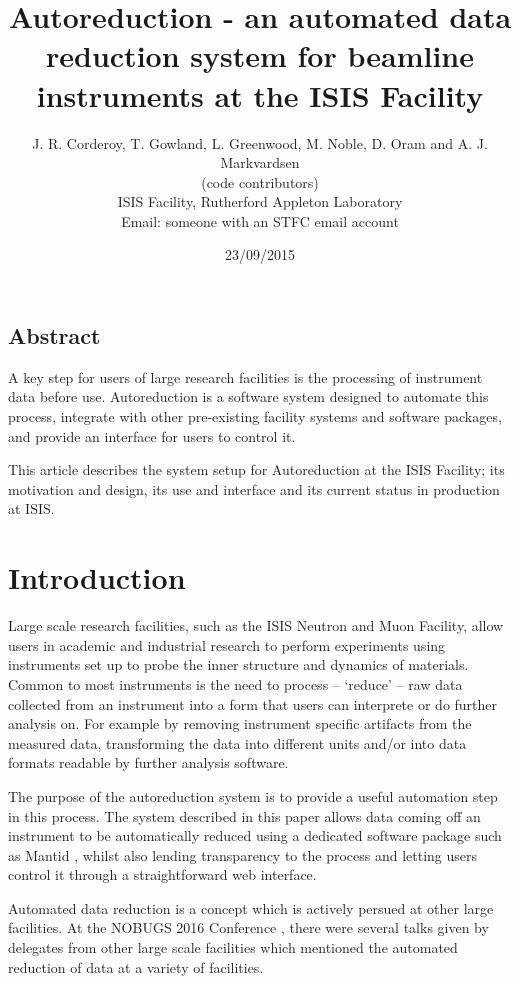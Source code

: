 \documentclass[twocolumn]{article}
\title{\textbf{Autoreduction - an automated data reduction system for beamline instruments at the ISIS Facility}}
\author{J. R. Corderoy, T. Gowland, L. Greenwood, M. Noble, D. Oram and A. J. Markvardsen \\
(code contributors)\\
ISIS Facility, Rutherford Appleton Laboratory\\
Email: someone with an STFC email account}
\date{23/09/2015}
\begin{document}
\maketitle

\subsection*{Abstract}\label{abstract}

A key step for users of large research facilities is the
processing of instrument data before use. Autoreduction is a software
system designed to automate this process, integrate with other
pre-existing facility systems and software packages, and provide
an interface for users to control it.

This article describes the system setup for Autoreduction at the ISIS Facility;
its motivation and design, its use and interface and its current status in production at ISIS.

\section{Introduction}\label{introduction}

Large scale research facilities, such as the ISIS Neutron and Muon
Facility, allow users in academic and industrial research
to perform experiments using instruments set up to probe the inner 
structure and dynamics of materials. 
Common to most instruments is the need to process -- 
`reduce' -- raw data collected from an instrument into a form
that users can interprete or do further analysis on. For example
by removing instrument specific artifacts from the measured data, 
transforming the data into different units and/or
into data formats readable by further analysis software.

The purpose of the autoreduction system is to provide a useful automation
step in this process. The system described in this paper allows data coming 
off an instrument to be automatically reduced using a dedicated software package 
such as Mantid \cite{mantid}, whilst also lending transparency to the process and
letting users control it through a straightforward web interface.

Automated data reduction is a concept which is actively persued at other large facilities.
At the NOBUGS 2016 Conference \cite{NOBUGS}, there were several talks given by delegates
from other large scale facilities which mentioned the automated reduction of data at a variety
of facilities. 
\end{document}
